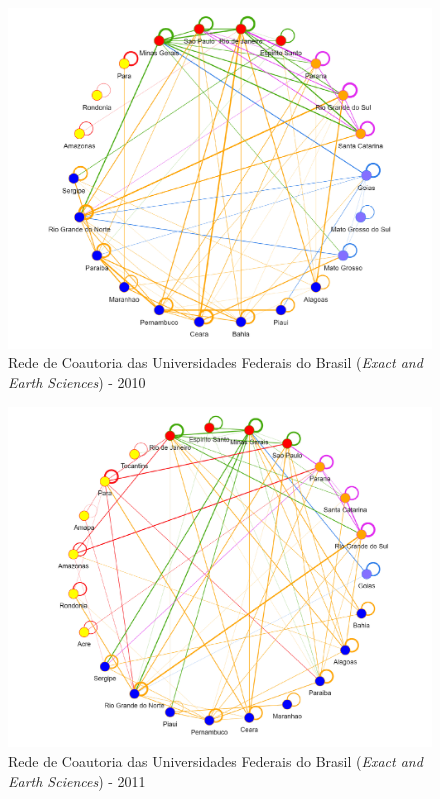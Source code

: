 \begin{figure}[H]
	\centering
	\includegraphics[width=\linewidth]{Imagens/rede-exact-br-2010.pdf}
	\caption{Rede de Coautoria das Universidades Federais do Brasil (\textit{Exact and Earth Sciences}) - 2010}
	\label{Rede de Coautoria - UF EXACT BR 2010}
\end{figure}

\begin{figure}[H]
	\centering
	\includegraphics[width=\linewidth]{Imagens/rede-exact-br-2011.pdf}
	\caption{Rede de Coautoria das Universidades Federais do Brasil (\textit{Exact and Earth Sciences}) - 2011}
	\label{Rede de Coautoria - UF EXACT BR 2011}
\end{figure}


